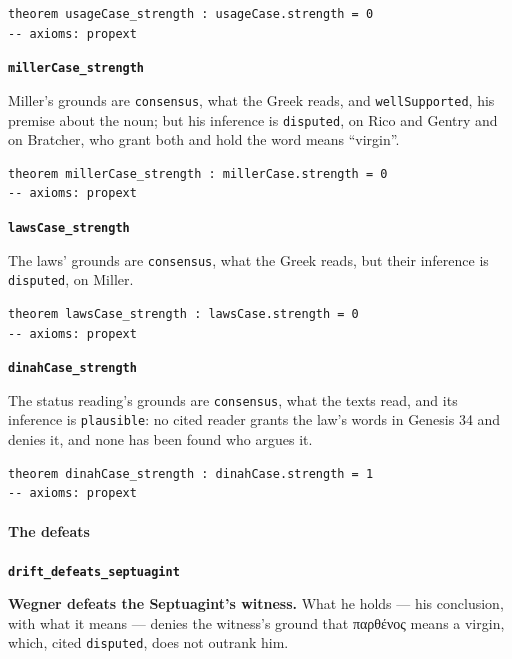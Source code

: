 \documentclass[11pt]{article}
\begin{document}
{\small\begin{verbatim}
theorem usageCase_strength : usageCase.strength = 0
-- axioms: propext
\end{verbatim}}
\par\medskip\noindent\textbf{\texttt{miller\allowbreak{}Case\_\allowbreak{}strength}}\par\nobreak\noindent
Miller’s grounds are \texttt{consensus}, what the Greek reads, and \texttt{well\allowbreak{}Supported}, his premise about the noun; but his inference is \texttt{disputed}, on Rico and Gentry and on Bratcher, who grant both and hold the word means “virgin”.

{\small\begin{verbatim}
theorem millerCase_strength : millerCase.strength = 0
-- axioms: propext
\end{verbatim}}
\par\medskip\noindent\textbf{\texttt{laws\allowbreak{}Case\_\allowbreak{}strength}}\par\nobreak\noindent
The laws’ grounds are \texttt{consensus}, what the Greek reads, but their inference is \texttt{disputed}, on Miller.

{\small\begin{verbatim}
theorem lawsCase_strength : lawsCase.strength = 0
-- axioms: propext
\end{verbatim}}
\par\medskip\noindent\textbf{\texttt{dinah\allowbreak{}Case\_\allowbreak{}strength}}\par\nobreak\noindent
The status reading’s grounds are \texttt{consensus}, what the texts read, and its inference is \texttt{plausible}: no cited reader grants the law’s words in Genesis 34 and denies it, and none has been found who argues it.

{\small\begin{verbatim}
theorem dinahCase_strength : dinahCase.strength = 1
-- axioms: propext
\end{verbatim}}
\paragraph*{The defeats}
\leavevmode\par\nobreak
\par\medskip\noindent\textbf{\texttt{drift\_\allowbreak{}defeats\_\allowbreak{}septuagint}}\par\nobreak\noindent
\textbf{Wegner defeats the Septuagint’s witness.} What he holds — his conclusion, with what it means — denies the witness’s ground that παρθένος means a virgin, which, cited \texttt{disputed}, does not outrank him.
\end{document}
